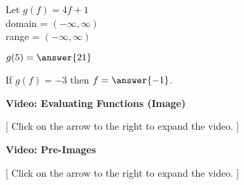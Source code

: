 \documentclass{ximera}
\begin{document}
\begin{question}

Let $g(f) = 4f+1$ \\
domain = $(-\infty, \infty)$ \\
range = $(-\infty, \infty)$


$g(5) = \answer{21}$

If $g(f) = -3$ then $f = \answer{-1}$.
\end{question}






\begin{explanation} \textbf{Video: Evaluating Functions (Image)}

[ Click on the arrow to the right to expand the video. ]
\begin{expandable} 

\begin{center}
\end{center}

\end{expandable}
\end{explanation}







\begin{explanation} \textbf{Video: Pre-Images}

[ Click on the arrow to the right to expand the video. ]
\begin{expandable} 

\begin{center}
\end{center}

\end{expandable}
\end{explanation}
\end{document}
